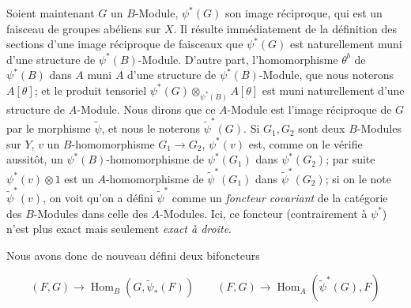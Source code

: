 Soient maintenant $G$ un $B$-Module, $\psi^*(G)$ son image réciproque, qui est un faisceau de groupes abéliens sur $X$. Il résulte immédiatement de la définition des sections d'une image réciproque de faisceaux que $\psi^*(G)$ est naturellement muni d'une structure de $\psi^*(B)$-Module. D'autre part, l'homomorphisme $\theta^b$ de $\psi^*(B)$ dans $A$ muni $A$ d'une structure de $\psi^*(B)$-Module, que nous noterons $A[\theta]$; et le produit tensoriel $\psi^*(G) \otimes_{\psi^*(B)} A[\theta]$ est muni naturellement d'une structure de $A$-Module. Nous dirons que ce $A$-Module est l'image réciproque de $G$ par le morphisme $\tilde{\psi}$, et nous le noterons $\tilde{\psi}^*(G)$. Si $G_1, G_2$ sont deux $B$-Modules sur $Y$, $v$ un $B$-homomorphisme $G_1 \to G_2$, $\psi^*(v)$ est, comme on le vérifie aussitôt, un $\psi^*(B)$-homomorphisme de $\psi^*(G_1)$ dans $\psi^*(G_2)$; par suite $\psi^*(v) \otimes 1$ est un $A$-homomorphisme de $\tilde{\psi}^*(G_1)$ dans $\tilde{\psi}^*(G_2)$; si on le note $\tilde{\psi}^*(v)$, on voit qu'on a défini $\tilde{\psi}^*$ comme un \emph{foncteur covariant} de la catégorie des $B$-Modules dans celle des $A$-Modules. Ici, ce foncteur (contrairement à $\psi^*$) n'est plus exact mais seulement \emph{exact à droite}.

Nous avons donc de nouveau défini deux bifoncteurs

$$(F, G) \to \operatorname{Hom}_B(G, \tilde{\psi}_*(F)) \quad\quad (F, G) \to \operatorname{Hom}_A(\tilde{\psi}^*(G), F)$$

\newpage


